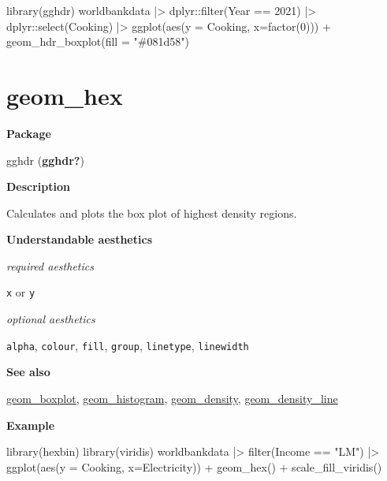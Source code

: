 \documentclass[
  letterpaper,
  DIV=11,
  numbers=noendperiod]{scrreprt}
\newenvironment{Shaded}{\begin{snugshade}}{\end{snugshade}}
\newcommand{\AttributeTok}[1]{\textcolor[rgb]{0.40,0.45,0.13}{#1}}
\newcommand{\DecValTok}[1]{\textcolor[rgb]{0.68,0.00,0.00}{#1}}
\newcommand{\FunctionTok}[1]{\textcolor[rgb]{0.28,0.35,0.67}{#1}}
\newcommand{\NormalTok}[1]{\textcolor[rgb]{0.00,0.23,0.31}{#1}}
\newcommand{\SpecialCharTok}[1]{\textcolor[rgb]{0.37,0.37,0.37}{#1}}
\newcommand{\StringTok}[1]{\textcolor[rgb]{0.13,0.47,0.30}{#1}}
\begin{document}
\begin{Shaded}
\begin{Highlighting}[]
\FunctionTok{library}\NormalTok{(gghdr)}
\NormalTok{worldbankdata }\SpecialCharTok{|\textgreater{}}
\NormalTok{  dplyr}\SpecialCharTok{::}\FunctionTok{filter}\NormalTok{(Year }\SpecialCharTok{==} \DecValTok{2021}\NormalTok{) }\SpecialCharTok{|\textgreater{}}
\NormalTok{  dplyr}\SpecialCharTok{::}\FunctionTok{select}\NormalTok{(Cooking) }\SpecialCharTok{|\textgreater{}}
\FunctionTok{ggplot}\NormalTok{(}\FunctionTok{aes}\NormalTok{(}\AttributeTok{y =}\NormalTok{ Cooking, }\AttributeTok{x=}\FunctionTok{factor}\NormalTok{(}\DecValTok{0}\NormalTok{))) }\SpecialCharTok{+} 
  \FunctionTok{geom\_hdr\_boxplot}\NormalTok{(}\AttributeTok{fill =} \StringTok{"\#081d58"}\NormalTok{) }
\end{Highlighting}
\end{Shaded}

\section{geom\_hex}\label{hex}

\textbf{Package}

gghdr (\textbf{gghdr?})

\textbf{Description}

Calculates and plots the box plot of highest density regions.

\textbf{Understandable aesthetics}

\emph{required aesthetics}

\texttt{x} or \texttt{y}

\emph{optional aesthetics}

\texttt{alpha}, \texttt{colour}, \texttt{fill}, \texttt{group},
\texttt{linetype}, \texttt{linewidth}

\textbf{See also}

\hyperref[boxplot]{geom\_boxplot},
\hyperref[histogram]{geom\_histogram},
\hyperref[density]{geom\_density},
\hyperref[density_line]{geom\_density\_line}

\textbf{Example}

\begin{Shaded}
\begin{Highlighting}[]
\FunctionTok{library}\NormalTok{(hexbin)}
\FunctionTok{library}\NormalTok{(viridis)}
\NormalTok{worldbankdata }\SpecialCharTok{|\textgreater{}}
  \FunctionTok{filter}\NormalTok{(Income }\SpecialCharTok{==} \StringTok{"LM"}\NormalTok{) }\SpecialCharTok{|\textgreater{}}
  \FunctionTok{ggplot}\NormalTok{(}\FunctionTok{aes}\NormalTok{(}\AttributeTok{y =}\NormalTok{ Cooking, }\AttributeTok{x=}\NormalTok{Electricity)) }\SpecialCharTok{+} 
  \FunctionTok{geom\_hex}\NormalTok{() }\SpecialCharTok{+} 
  \FunctionTok{scale\_fill\_viridis}\NormalTok{()}
\end{Highlighting}
\end{Shaded}
\end{document}
